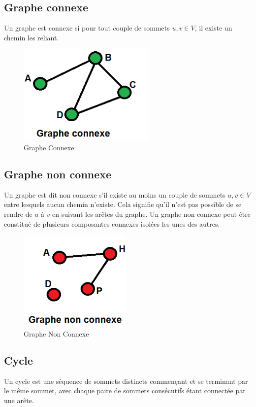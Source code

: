 \subsection{Graphe connexe}
Un graphe est connexe si pour tout couple de sommets \( u, v \in V \), il existe un chemin les reliant.

\begin{figure}[H]
    \centering
    \includegraphics[width=0.3 \textwidth]{Assets/Graphe Connexe.PNG}
    \caption{Graphe Connexe }
    \label{fig:Graphe Connexe}
\end{figure}




\newpage




\subsection{Graphe non connexe}
Un graphe est dit non connexe s'il existe au moins un couple de sommets \( u, v \in V \) entre lesquels aucun chemin n'existe. Cela signifie qu'il n'est pas possible de se rendre de \( u \) à \( v \) en suivant les arêtes du graphe. Un graphe non connexe peut être constitué de plusieurs composantes connexes isolées les unes des autres.

\begin{figure}[H]
    \centering
    \includegraphics[width=0.3 \textwidth]{Assets/Graphe Non Connexe.PNG}
    \caption{Graphe Non Connexe }
    \label{fig:Graphe Non Connexe}
\end{figure}




\subsection{Cycle}
Un cycle est une séquence de sommets distincts commençant et se terminant par le même sommet, avec chaque paire de sommets consécutifs étant connectée par une arête.

